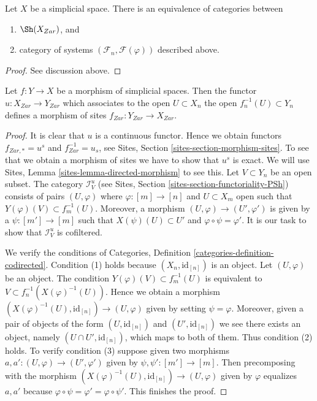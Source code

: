 \begin{lemma}
\label{lemma-describe-sheaves-simplicial-site}
Let $X$ be a simplicial space. There is an equivalence of
categories between
\begin{enumerate}
\item $\Sh(X_{Zar})$, and
\item category of systems $(\mathcal{F}_n, \mathcal{F}(\varphi))$
described above.
\end{enumerate}
\end{lemma}

\begin{proof}
See discussion above.
\end{proof}

\begin{lemma}
\label{lemma-simplicial-space-site-functorial}
Let $f : Y \to X$ be a morphism of simplicial spaces.
Then the functor $u : X_{Zar} \to Y_{Zar}$
which associates to the open $U \subset X_n$ the open
$f_n^{-1}(U) \subset Y_n$ defines a morphism of sites
$f_{Zar} : Y_{Zar} \to X_{Zar}$.
\end{lemma}

\begin{proof}
It is clear that $u$ is a continuous functor. Hence we obtain functors
$f_{Zar, *} = u^s$ and $f_{Zar}^{-1} = u_s$, see
Sites, Section \ref{sites-section-morphism-sites}.
To see that we obtain a morphism of sites we have to show
that $u^s$ is exact. We will use
Sites, Lemma \ref{sites-lemma-directed-morphism} to see this.
Let $V \subset Y_n$ be an open subset. The category
$\mathcal{I}_V^u$ (see Sites, Section \ref{sites-section-functoriality-PSh})
consists of pairs $(U, \varphi)$ where
$\varphi : [m] \to [n]$ and $U \subset X_m$ open such that
$Y(\varphi)(V) \subset f_m^{-1}(U)$. Moreover, a morphism
$(U, \varphi) \to (U', \varphi')$ is given by a
$\psi : [m'] \to [m]$ such that $X(\psi)(U) \subset U'$
and $\varphi \circ \psi = \varphi'$.
It is our task to show that $\mathcal{I}_V^u$ is cofiltered.

\medskip\noindent
We verify the conditions of
Categories, Definition \ref{categories-definition-codirected}.
Condition (1) holds because $(X_n, \text{id}_{[n]})$ is an object.
Let $(U, \varphi)$ be an object. The condition
$Y(\varphi)(V) \subset f_m^{-1}(U)$ is equivalent to
$V \subset f_n^{-1}(X(\varphi)^{-1}(U))$. Hence we obtain a morphism
$(X(\varphi)^{-1}(U), \text{id}_{[n]}) \to (U, \varphi)$ given
by setting $\psi = \varphi$. Moreover, given a pair of objects
of the form $(U, \text{id}_{[n]})$ and $(U', \text{id}_{[n]})$
we see there exists an object, namely $(U \cap U', \text{id}_{[n]})$,
which maps to both of them. Thus condition (2) holds.
To verify condition (3) suppose given two morphisms
$a, a': (U, \varphi) \to (U', \varphi')$ given by $\psi, \psi' : [m'] \to [m]$.
Then precomposing with the morphism
$(X(\varphi)^{-1}(U), \text{id}_{[n]}) \to (U, \varphi)$ given
by $\varphi$ equalizes $a, a'$ because
$\varphi \circ \psi = \varphi' = \varphi \circ \psi'$.
This finishes the proof.
\end{proof}


